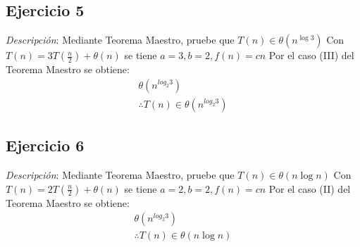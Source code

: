         \subsection{Ejercicio 5}
            \textit{Descripción}: Mediante Teorema Maestro, pruebe que \(T(n) \in \theta(n^{\log{3}})\)
            \newline
            Con \(T(n) = 3T(\frac{n}{2}) + \theta(n)\) se tiene \(a=3, b=2, f(n) = cn\)
            \newline
            Por el caso (III) del Teorema Maestro se obtiene: 
                \begin{gather*}
                    \theta(n^{log_{2}3})\\
                    \therefore T(n)\in \theta(n^{log_{2}3})
                \end{gather*}
                
        \subsection{Ejercicio 6}
            \textit{Descripción}: Mediante Teorema Maestro, pruebe que \(T(n) \in \theta(n\log{n})\)
            \newline
            Con \(T(n) = 2T(\frac{n}{2}) + \theta(n)\) se tiene \(a=2, b=2, f(n) = cn\)
            \newline
            Por el caso (II) del Teorema Maestro se obtiene: 
                \begin{gather*}
                    \theta(n^{log_{2}3})\\
                    \therefore T(n)\in \theta(n\log{n})
                \end{gather*}